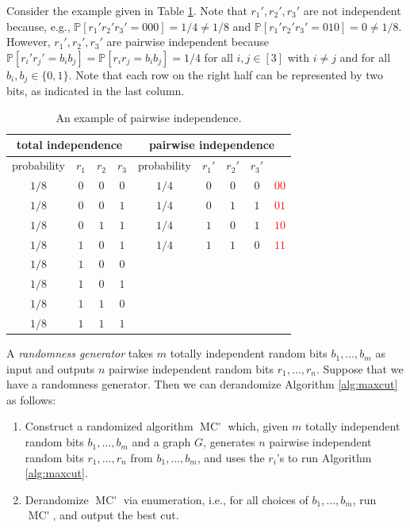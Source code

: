 \documentclass[letterpaper, reqno,11pt]{article}
\newcommand{\PP}{\mathbb{P}}
\DeclareMathOperator{\MCprime}{MC'}
\begin{document}
Consider the example given in Table \ref{tab:pairwise-ind}. Note that $r_1', r_2', r_3'$ are not independent because, e.g., $\PP[r_1'r_2'r_3' = 000] = 1/4 \neq 1/8$ and $\PP[r_1'r_2'r_3'=010] = 0 \neq 1/8$. However, $r_1', r_2', r_3'$ are pairwise independent because $\PP[r_i' r_j' = b_i b_j] = \PP[r_i r_j = b_i b_j] = 1/4$ for all $i, j \in [3]$ with $i \neq j$ and for all $b_i, b_j \in \{ 0, 1 \}$. Note that each row on the right half can be represented by two bits, as indicated in the last column.

\begin{table}[h]
  \centering
  \begin{tabular}{cccc|ccccc}
    \multicolumn{4}{c|}{total independence} & \multicolumn{5}{c}{pairwise independence} \\
    \hline
    probability & $r_1$ & $r_2$ & $r_3$ & probability & $r_1'$ & $r_2'$ & $r_3'$ \\
    $1/8$ & $0$ & $0$ & $0$ & $1/4$ & $0$ & $0$ & $0$ & \textcolor{red}{$00$} \\
    $1/8$ & $0$ & $0$ & $1$ & $1/4$ & $0$ & $1$ & $1$ & \textcolor{red}{$01$} \\
    $1/8$ & $0$ & $1$ & $1$ & $1/4$ & $1$ & $0$ & $1$ & \textcolor{red}{$10$} \\
    $1/8$ & $1$ & $0$ & $1$ & $1/4$ & $1$ & $1$ & $0$ & \textcolor{red}{$11$} \\
    $1/8$ & $1$ & $0$ & $0$ \\
    $1/8$ & $1$ & $0$ & $1$ \\
    $1/8$ & $1$ & $1$ & $0$ \\
    $1/8$ & $1$ & $1$ & $1$ \\
  \end{tabular}
  \caption{An example of pairwise independence.}
  \label{tab:pairwise-ind}
\end{table}

A \emph{randomness generator} takes $m$ totally independent random bits $b_1, \ldots, b_m$ as input and outputs $n$ pairwise independent random bits $r_1, \ldots, r_n$. Suppose that we have a randomness generator. Then we can derandomize Algorithm \ref{alg:maxcut} as follows:
\begin{enumerate}[label=(\roman*), itemsep=0pt]
  \item Construct a randomized algorithm $\MCprime$ which, given $m$ totally independent random bits $b_1, \ldots, b_m$ and a graph $G$, generates $n$ pairwise independent random bits $r_1, \ldots, r_n$ from $b_1, \ldots, b_m$, and uses the $r_i$'s to run Algorithm \ref{alg:maxcut}.
  \item Derandomize $\MCprime$ via enumeration, i.e., for all choices of $b_1, \ldots, b_m$, run $\MCprime$, and output the best cut.
\end{enumerate}
\end{document}
